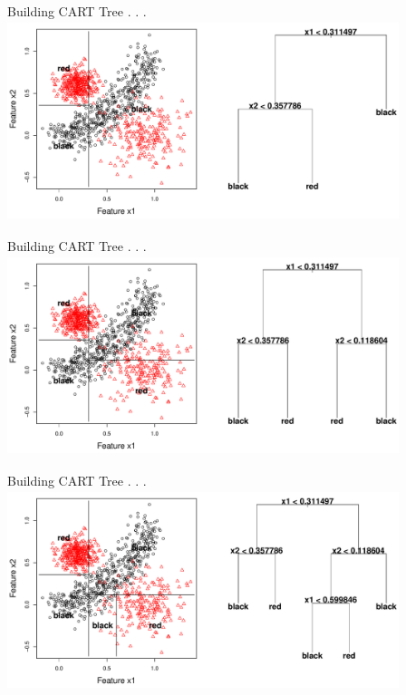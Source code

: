 \documentclass[12pt]{beamer}
\begin{document}
\begin{frame}{Building CART Tree . . .}
\includegraphics[height=2.3in,width=4.5in]{figs/tree_2.pdf}
\end{frame}


\begin{frame}{Building CART Tree . . .}
\includegraphics[height=2.3in,width=4.5in]{figs/tree_4.pdf}
\end{frame}

\begin{frame}{Building CART Tree . . .}
\includegraphics[height=2.3in,width=4.5in]{figs/tree_5.pdf}
\end{frame}
\end{document}
